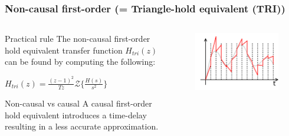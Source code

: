 \begin{frame}
	\frametitle{Non-causal first-order (= Triangle-hold equivalent (TRI))}
\begin{columns}
	\begin{column}{0.5\textwidth}
	\begin{block}{Practical rule}
		The non-causal first-order hold equivalent transfer function $H_{tri}(z)$ can be found by computing the following:
		\begin{center}
			$H_{tri}(z) = \frac{(z-1)^{2}}{Tz} \mathcal{Z}\{\frac{H(s)}{s^{2}}\}$
		\end{center}
	\end{block}
	
	\begin{alertblock}{Non-causal vs causal}
		A causal first-order hold equivalent introduces a time-delay resulting in a less accurate approximation.
	\end{alertblock}
	\end{column}
	
	\begin{column}{0.5\textwidth}
		\begin{figure}
			\centering
			\includegraphics[width=1\linewidth]{first-order}
		\end{figure}
	\end{column}
\end{columns}
\end{frame}

